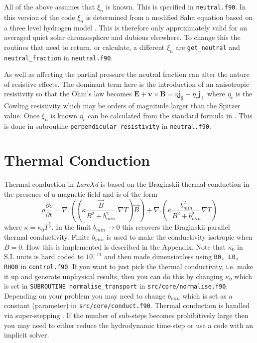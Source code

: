 \documentclass[11pt]{article}
\begin{document}
All of the above assumes that $\xi_n$ is known. This is specified in \texttt{neutral.f90}. In this version of the code $\xi_n$ is 
determined from a modified Saha equation based on a three level hydrogen model \cite{brown}. This is therefore only approximately 
valid for an averaged quiet solar chromosphere and dubious elsewhere. To change this the routines that need to return, or calculate, 
a different $\xi_n$ 
are \texttt{get\_neutral} and \texttt{neutral\_fraction} in \texttt{neutral.f90}. 

As well as affecting the partial pressure the neutral fraction can alter the nature of resistive effects. The dominant 
term here is the introduction of an anisotropic resistivity so that the Ohm's law becomes
$\mathbf{E}+\mathbf{v}\times\mathbf{B}=\eta \mathbf{j_{\parallel}} + \eta_c \mathbf{j_{\perp}}$
where $\eta_c$ is the Cowling resistivity which may be orders of magnitude larger than the Spitzer value. Once $\xi_n$ 
is known $\eta_c$ can be calculated from the standard formula in \cite{flux-emergence}. This is done in subroutine 
\texttt{perpendicular\_resistivity} in \texttt{neutral.f90}.

\section{Thermal Conduction} %
\label{sec:thermal_conduction}
Thermal conduction in {\it LareXd} is based on the Braginskii thermal conduction in the presence of a magnetic field 
and is of the form\\
\[
\rho \frac{\partial \epsilon}{\partial t} = \nabla . \left(\left(\kappa \frac{\vec{B}}{B^2+b_{min}^2}. 
\nabla T\right) \vec{B} \right) +  \nabla . \left(\kappa  \frac{b_{min}^2}{B^2+b_{min}^2}  \nabla T \right)
\]
where $\kappa = \kappa_0  T^\frac{5}{2}$. In the limit $b_{min}\to 0$ this recovers the Braginskii parallel thermal 
conductivity. Finite $b_{min}$ is used to make the conductivity isotropic when $B=0$.  How this is implemented is 
described in the Appendix. Note that $\kappa_0$ in S.I. units is hard coded to $10^{-11}$ and then made dimensionless using 
{\tt B0, L0, RHO0} in {\tt control.f90}. If you want to just pick the thermal conductivity, 
i.e. make it up and generate unphysical results, then you can do this by changing $\kappa_0$ 
which is set in {\tt SUBROUTINE normalise\_transport} in {\tt src/core/normalise.f90}. Depending 
on your problem you may need to change $b_{min}$ which is set as a constant (parameter) in 
{\tt src/core/conduct.f90}. Thermal conduction is handled via super-stepping \cite{Meyer:2012eb}. 
If the number of sub-steps becomes prohibitively large then you may need to either reduce the hydrodynamic
time-step or use a code with an implicit solver.
\end{document}
